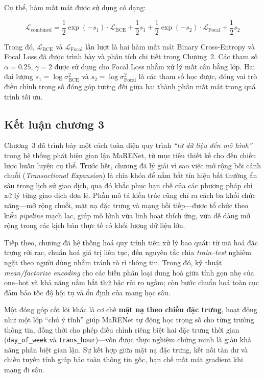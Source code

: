 Cụ thể, hàm mất mát được sử dụng có dạng:

\begin{equation}
\mathcal{L}_{\text{combined}} = \frac{1}{2} \exp(-s_1) \cdot \mathcal{L}_{\text{BCE}} + \frac{1}{2} s_1 + \frac{1}{2} \exp(-s_2) \cdot \mathcal{L}_{\text{Focal}} + \frac{1}{2} s_2
\end{equation}

Trong đó, \(\mathcal{L}_{\text{BCE}}\) và \(\mathcal{L}_{\text{Focal}}\) lần lượt là hai hàm mất mát Binary Cross-Entropy và Focal Loss đã được trình bày và phân tích chi tiết trong Chương~2. Các tham số \(\alpha = 0.25\), \(\gamma = 2\) được sử dụng cho Focal Loss nhằm xử lý mất cân bằng lớp. Hai đại lượng \(s_1 = \log \sigma_{\text{BCE}}^2\) và \(s_2 = \log \sigma_{\text{Focal}}^2\) là các tham số học được, đóng vai trò điều chỉnh trọng số đóng góp tương đối giữa hai thành phần mất mát trong quá trình tối ưu.


\subsection{Kết luận chương 3}

Chương~3 đã trình bày một cách toàn diện quy trình \textit{“từ dữ liệu đến mô hình”} trong hệ thống phát hiện gian lận MaRENet, từ mục tiêu thiết kế cho đến chiến lược huấn luyện cụ thể. Trước hết, chương đã lý giải vì sao việc mở rộng bối cảnh chuỗi (\emph{Transactional Expansion}) là chìa khóa để nắm bắt tín hiệu bất thường ẩn sâu trong lịch sử giao dịch, qua đó khắc phục hạn chế của các phương pháp chỉ xử lý từng giao dịch đơn lẻ. Phần mô tả kiến trúc cũng chỉ ra cách ba khối chức năng—mở rộng chuỗi, mặt nạ đặc trưng và mạng hồi tiếp—được tổ chức theo kiểu \emph{pipeline} mạch lạc, giúp mô hình vừa linh hoạt thích ứng, vừa dễ dàng mở rộng trong các kịch bản thực tế có khối lượng dữ liệu lớn.

Tiếp theo, chương đã hệ thống hoá quy trình tiền xử lý bao quát: từ mã hoá đặc trưng rời rạc, chuẩn hoá giá trị liên tục, đến nguyên tắc chia \textit{train–test} nghiêm ngặt theo người dùng nhằm tránh rò rỉ thông tin. Trong đó, kỹ thuật \emph{mean/factorize encoding} cho các biến phân loại dung hoà giữa tính gọn nhẹ của one–hot và khả năng nắm bắt thứ bậc rủi ro ngầm; còn bước chuẩn hoá toàn cục đảm bảo tốc độ hội tụ và ổn định của mạng học sâu.

Một đóng góp cốt lõi khác là cơ chế \textbf{mặt nạ theo chiều đặc trưng}, hoạt động như một lớp “chú ý tĩnh” giúp MaRENet tự động học trọng số cho từng trường thông tin, đồng thời cho phép điều chỉnh riêng biệt hai đặc trưng thời gian (\texttt{day\_of\_week} và \texttt{trans\_hour})—vốn được thực nghiệm chứng minh là giàu khả năng phân biệt gian lận. Sự kết hợp giữa mặt nạ đặc trưng, kết nối tàn dư và chiếu tuyến tính giúp bảo toàn thông tin gốc, hạn chế mất mát gradient khi mạng đi sâu.

